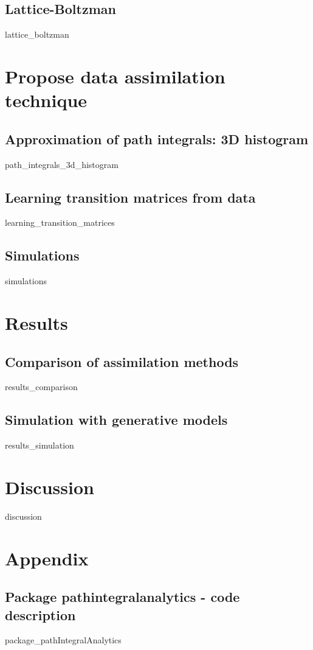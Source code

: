 \documentclass[10pt,a4paper]{report}
\begin{document}
\section{Lattice-Boltzman}
	{lattice_boltzman}



\chapter{Propose data assimilation technique}

\section{Approximation of path integrals: 3D histogram}
	{path_integrals_3d_histogram}

\section{Learning transition matrices from data}
	{learning_transition_matrices}

\section{Simulations}
	{simulations}



\chapter{Results}

\section{Comparison of assimilation methods}
	{results_comparison}

\section{Simulation with generative models}
	{results_simulation}



\chapter{Discussion}

	{discussion}



\chapter{Appendix}

\section{Package pathintegralanalytics - code description}
	{package_pathIntegralAnalytics}
\end{document}
